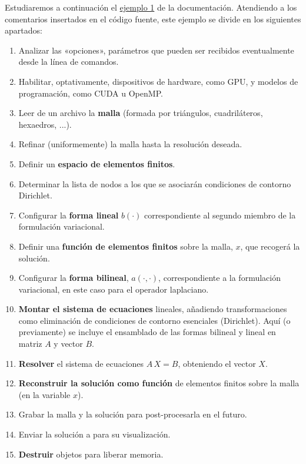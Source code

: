Estudiaremos a continuación el
\href{https://github.com/mfem/mfem/blob/master/examples/ex1.cpp}{ejemplo
  1} de la documentación. Atendiendo a los comentarios insertados en
el código fuente, este ejemplo se divide en los siguientes apartados:
\begin{enumerate}
\item Analizar las «opciones», parámetros que pueden ser
  recibidos eventualmente desde la línea de comandos.
\item Habilitar, optativamente, dispositivos de hardware, como GPU, y
  modelos de programación, como CUDA u OpenMP.
\item Leer de un archivo la \textbf{malla} (formada por triángulos,
  cuadriláteros, hexaedros, ...).
\item Refinar (uniformemente) la malla hasta la resolución deseada.
\item Definir un \textbf{espacio de elementos finitos}.
\item Determinar la lista de nodos a los que se asociarán condiciones
  de contorno Dirichlet.
\item Configurar la \textbf{forma lineal} $b(\cdot)$ correspondiente al
  segundo miembro de la formulación variacional.
\item Definir una \textbf{función de elementos finitos} sobre la malla, $x$,
  que recogerá la solución.
\item Configurar la \textbf{forma bilineal}, $a(\cdot,\cdot)$, correspondiente
  a la formulación variacional, en este caso para el operador laplaciano.
\item \textbf{Montar el sistema de ecuaciones} lineales, añadiendo
  transformaciones como eliminación de condiciones de contorno
  esenciales (Dirichlet). Aquí (o previamente) se incluye el
  ensamblado de las formas bilineal y lineal en matriz $A$ y vector $B$.
\item \textbf{Resolver} el sistema de ecuaciones $A\, X= B$, obteniendo el vector $X$.
\item \textbf{Reconstruir la solución como función} de elementos finitos sobre la malla (en la variable $x$).
\item Grabar la malla y la solución para post-procesarla en el futuro.
\item Enviar la solución a \glvis para su visualización.
\item \textbf{Destruir} objetos para liberar memoria.
\end{enumerate}


